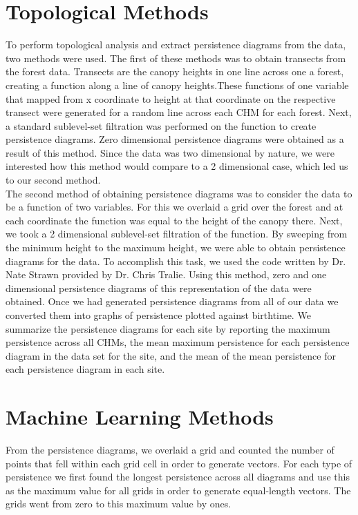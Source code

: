 \documentclass[10pt]{article}
\begin{document}
\section*{Topological Methods}
To perform topological analysis and extract persistence diagrams from the data, two methods were used. The first of these methods was to obtain transects from the forest data. Transects are the canopy heights in one line across one a forest, creating a function along a line of canopy heights.These functions of one variable that mapped from x coordinate to height at that coordinate on the respective transect were generated for a random line across each CHM for each forest. Next, a standard sublevel-set filtration was performed on the function to create persistence diagrams. Zero dimensional persistence diagrams were obtained as a result of this method. Since the data was two dimensional by nature, we were interested how this method would compare to a 2 dimensional case, which led us to our second method.\\

The second method of obtaining persistence diagrams was to consider the data to be a function of two variables. For this we overlaid a grid over the forest and at each coordinate the function was equal to the height of the canopy there. Next, we took a 2 dimensional sublevel-set filtration of the function. By sweeping from the minimum height to the maximum height, we were able to obtain persistence diagrams for the data. To accomplish this task, we used the code written by Dr. Nate Strawn provided by Dr. Chris Tralie. Using this method, zero and one dimensional persistence diagrams of this representation of the data were obtained. Once we had generated persistence diagrams from all of our data we converted them into graphs of persistence plotted against birthtime. We summarize the persistence diagrams for each site by reporting the maximum persistence across all CHMs, the mean maximum persistence for each persistence diagram in the data set for the site, and the mean of the mean persistence for each persistence diagram in each site.

\section*{Machine Learning Methods}

From the persistence diagrams, we overlaid a grid and counted the number of points that fell within each grid cell in order to generate vectors. For each type of persistence we first found the longest persistence across all diagrams and use this as the maximum value for all grids in order to generate equal-length vectors. The grids went from zero to this maximum value by ones.
\end{document}
